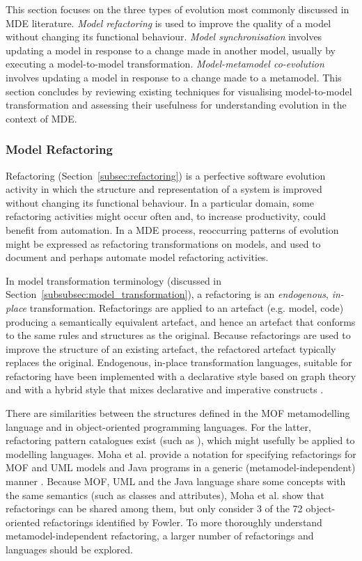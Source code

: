 This section focuses on the three types of evolution most commonly discussed in MDE literature. \emph{Model refactoring} is used to improve the quality of a model without changing its functional behaviour. \emph{Model synchronisation} involves updating a model in response to a change made in another model, usually by executing a model-to-model transformation. \emph{Model-metamodel co-evolution} involves updating a model in response to a change made to a metamodel. This section concludes by reviewing existing techniques for visualising model-to-model transformation and assessing their usefulness for understanding evolution in the context of MDE. 

\subsubsection{Model Refactoring}
Refactoring (Section~\ref{subsec:refactoring}) is a perfective software evolution activity in which the structure and representation of a system is improved without changing its functional behaviour. In a particular domain, some refactoring activities might occur often and, to increase productivity, could benefit from automation. In a MDE process, reoccurring patterns of evolution might be expressed as  refactoring transformations on models, and used to document and perhaps automate model refactoring activities. 

In model transformation terminology (discussed in Section~\ref{subsubsec:model_transformation}), a refactoring is an \emph{endogenous}, \emph{in-place} transformation. Refactorings are applied to an artefact (e.g. model, code) producing a semantically equivalent artefact, and hence an artefact that conforms to the same rules and structures as the original. Because refactorings are used to improve the structure of an existing artefact, the refactored artefact typically replaces the original. Endogenous, \cc in-place transformation languages, suitable for refactoring have been implemented with a declarative style based on graph theory \cite{biermann06refactoring,porres03refactoring} and with a hybrid style that mixes declarative and imperative constructs \cite{kolovos07ewl}.

There are similarities between the structures defined in the MOF metamodelling language and in object-oriented programming languages. For the latter, refactoring pattern catalogues exist (such as \cite{fowler99refactoring}), which might usefully be applied to modelling languages. Moha \cc et al. provide a notation for specifying refactorings for MOF and UML models and Java programs in a generic (metamodel-independent) manner \cite{moha09refactoring}. Because MOF, UML and the Java language share some concepts with the same semantics (such as classes and attributes), Moha et al. show that refactorings can be shared among them, but only consider 3 of the 72 object-oriented refactorings identified by Fowler. To more thoroughly understand metamodel-independent refactoring, a larger number of refactorings and languages should be explored.

